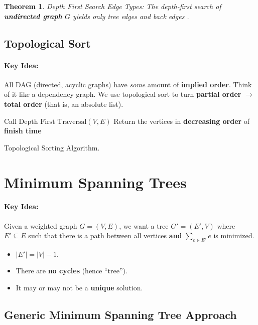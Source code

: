 \documentclass[a4paper,12pt]{report}
\newtheorem{theorem}{Theorem}
\begin{document}
\begin{theorem}{Depth First Search Edge Types: }
The depth-first search of \textbf{undirected graph} $G$ yields only \textit{tree edges} and \textit{back edges} .
\end{theorem}


\subsection{Topological Sort}

\paragraph{Key Idea: } All DAG (directed, acyclic graphs) have \textit{some} amount of \textbf{implied order}. Think of it like a dependency graph. We use topological sort to turn \textbf{partial order} $\to$ \textbf{total order} (that is, an absolute list).


\begin{algorithm}[H]
\SetAlgoLined
{}
	\BlankLine
	\BlankLine
	Call $\text{Depth First Traversal}(V,E)$\;
	Return the vertices in \textbf{decreasing order} of \textbf{finish time}\;
	\caption{Topological Sorting Algorithm.}
\end{algorithm}




\section{Minimum Spanning Trees}

\paragraph{Key Idea: } Given a weighted graph $G = (V, E)$, we want a tree $G' = (E', V)$ where $E' \subseteq E$ such that there is a path between all vertices \textbf{and} $\sum_{e\in E'} e$ is minimized.
\begin{itemize}
\item $|E'| = |V|-1$.
\item There are \textbf{no cycles} (hence ``tree'').
\item It may or may not be a \textbf{unique} solution.
\end{itemize}

\subsection{Generic Minimum Spanning Tree Approach}
\end{document}
